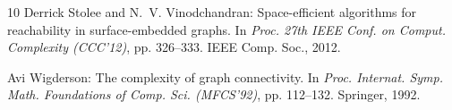 \documentclass[11pt]{article}
\numberwithin{equation}{section}
\theoremstyle{definition}
\theoremstyle{plain}
\begin{document}
\begin{thebibliography}{10}
{\sc Derrick Stolee and N.~V. Vinodchandran}: Space-efficient algorithms for
  reachability in surface-embedded graphs.
\newblock In {\em Proc. 27th IEEE Conf. on Comput. Complexity (CCC'12)}, pp.
  326--333. IEEE Comp. Soc., 2012.

{\sc Avi Wigderson}: The complexity of graph connectivity.
\newblock In {\em Proc. Internat. Symp. Math. Foundations of Comp. Sci.
  (MFCS'92)}, pp. 112--132. Springer, 1992.
\newblock [\epfmtdoi{10.1007/3-540-55808-X\_10}]

\end{thebibliography}
\end{document}

